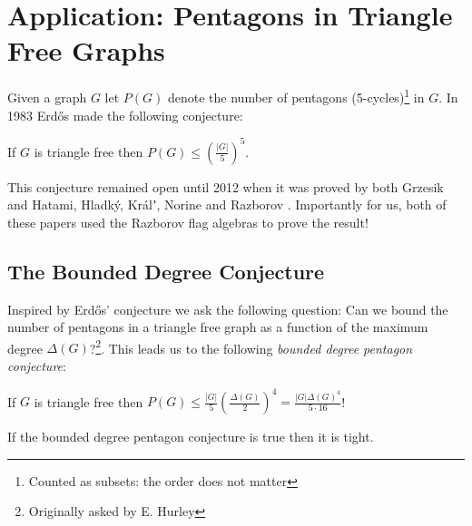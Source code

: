 \chapter{Application: Pentagons in Triangle Free Graphs}
\label{chap:pentagon_conjecture}

Given a graph $G$ let $P(G)$ denote the number of pentagons (5-cycles)\footnote{Counted as
subsets: the order does not matter} in $G$.
In 1983 \cite{erdosProblemsGraphTheory1984} Erd\H{o}s made the following conjecture:

\begin{knownconjecture}
    If $G$ is triangle free then $P(G) \leq \left(\frac{|G|}{5}\right)^5$.
\end{knownconjecture}

This conjecture remained open until 2012 when it was proved by both Grzesik
\cite{grzesikMaximumNumberFivecycles2012} and Hatami, Hladký, Králʼ, Norine and Razborov
\cite{hatamiNumberPentagonsTrianglefree2013}. 
Importantly for us, both of these papers used the Razborov flag algebras to prove the result!

\section{The Bounded Degree Conjecture}

Inspired by Erd\H{o}s' conjecture we ask
the following question: Can we bound the number of pentagons in a triangle free graph
as a function of the maximum degree $\Delta(G)$?\footnote{Originally asked by E. Hurley}.
This leads us to the following \textit{bounded degree pentagon conjecture}:

\begin{conjecture}
    \label{conj:bounded_pentagon}
    If $G$ is triangle free then 
    $P(G) \leq \frac{|G|}{5}\left(\frac{\Delta(G)}{2}\right)^4
    =\frac{|G|\Delta(G)^4}{5\cdot 16}$!
\end{conjecture}

\begin{lemma}
    If the bounded degree pentagon conjecture is true then it is tight.
\end{lemma}

